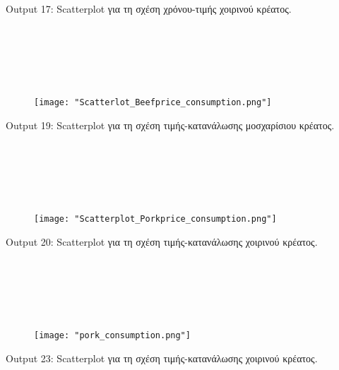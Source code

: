 \documentclass[10pt]{article}
\begin{document}
\begin{centering}

\renewcommand{\caption}{Output 17: }
\caption {Scatterplot για τη σχέση χρόνου-τιμής χοιρινού κρέατος. }
\end{centering}



\

\

\

\begin{figure}[H]
    \centering
    \texttt{[image: "Scatterlot\_Beefprice\_consumption.png"]}
    
    \label{fig:galaxy}
\end{figure}

\begin{centering}

\renewcommand{\caption}{Output 19: }
\caption {Scatterplot για τη σχέση τιμής-κατανάλωσης μοσχαρίσιου κρέατος. }
\end{centering}

\

\

\

\begin{figure}[H]
    \centering
    \texttt{[image: "Scatterplot\_Porkprice\_consumption.png"]}
    
    \label{fig:galaxy}
\end{figure}

\begin{centering}

\renewcommand{\caption}{Output 20: }
\caption {Scatterplot για τη σχέση τιμής-κατανάλωσης χοιρινού κρέατος. }
\end{centering}


\

\

\

\begin{figure}[H]
    \centering
    \texttt{[image: "pork\_consumption.png"]}
    
    \label{fig:galaxy}
\end{figure}

\begin{centering}

\renewcommand{\caption}{Output 23: }
\caption {Scatterplot για τη σχέση τιμής-κατανάλωσης χοιρινού κρέατος. }
\end{centering}
\

\
\end{document}
